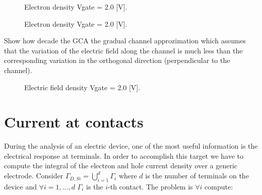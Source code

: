 \begin{figure}[!h]
\centering
{}
\hspace{0.5cm}
\hspace{0.5cm}
\caption{Electron density Vgate = 2.0 [V].}
\label{fig: ndensity mos}
\end{figure}

\begin{figure}[!h]
\centering
{}
\hspace{0.5cm}
\hspace{0.5cm}
\caption{Electron density Vgate = 2.0 [V].}
\label{fig: pdensity mos}
\end{figure}



Show how decade the GCA the gradual channel approzimation which assumes that the variation of the electric field along the channel is much less than the corresponding variation in the orthogonal direction (perpendicular to the channel).

\begin{figure}[!h]
\centering
{}
\hspace{0.5cm}
\hspace{0.5cm}
\caption{Electric field density Vgate = 2.0 [V].}
\end{figure}

\clearpage


\section{Current at contacts}

During the analysis of an electric device, one of the most useful information is the electrical response at terminals. In order to accomplish this target we have to compute the integral of the electron and hole current density over a generic electrode.
Consider $\Gamma_{D,Si} = \bigcup_{i=1}^d \Gamma_i$ where $d$ is the number of terminals on the device and $\forall i=1,...,d$ $\Gamma_i$ is the $i$-th contact. The problem is $\forall i$ compute:

